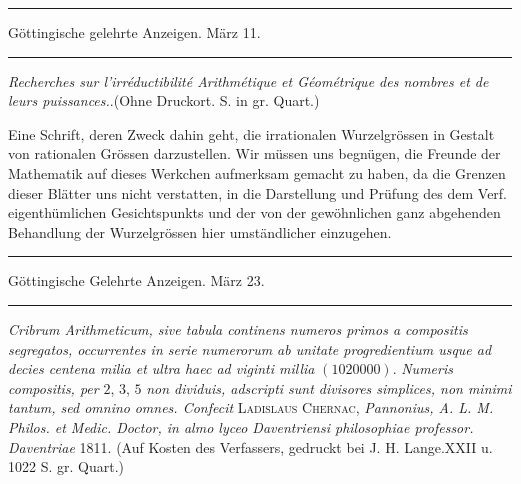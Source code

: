 \clearpage
{}%
\renewcommand{\BookRunningTitle}{Anzeigen nicht eigner Schriften}
\begin{center}
\rule{.86\linewidth}{.3pt}\par
Göttingische gelehrte Anzeigen. März 11.\par
\rule{.86\linewidth}{.3pt}
\end{center}
\begin{center}
\emph{Recherches sur l'irréductibilité Arithmétique et Géométrique des nombres et de leurs puissances.}.\quad (Ohne Druckort. S. in gr. Quart.)
\end{center}

Eine Schrift, deren Zweck dahin geht, die irrationalen Wurzelgrössen in Gestalt von rationalen Grössen darzustellen. Wir müssen uns begnügen, die Freunde der Mathematik auf dieses Werkchen aufmerksam gemacht zu haben, da die Grenzen dieser Blätter uns nicht verstatten, in die Darstellung und Prüfung des dem Verf. eigenthümlichen Gesichtspunkts und der von der gewöhnlichen ganz abgehenden Behandlung der Wurzelgrössen hier umständlicher einzugehen.

\begin{center}
\rule{.86\linewidth}{.3pt}\par
Göttingische Gelehrte Anzeigen. März 23.\par
\rule{.86\linewidth}{.3pt}
\end{center}
\emph{Cribrum Arithmeticum, sive tabula continens numeros primos a compositis segregatos, occurrentes in serie numerorum ab unitate progredientium usque ad decies centena milia et ultra haec ad viginti millia} $(1020000)$. \emph{Numeris compositis, per} $2$, $3$, $5$ \emph{non dividuis, adscripti sunt divisores simplices, non minimi tantum, sed omnino}
%
\emph{omnes. Confecit} \textsc{Ladislaus Chernac}, \emph{Pannonius, A. L. M. Philos. et Medic. Doctor, in almo lyceo Daventriensi philosophiae professor. Daventriae} 1811. (Auf Kosten des Verfassers, gedruckt bei J. H. Lange.\quad XXII u. 1022 S. gr. Quart.)

